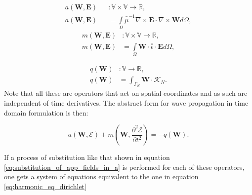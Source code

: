 \begin{equation}
\begin{array}{rcl}
      a(\mathbf{W},\mathbf{E})&&:\mathbb{V}\times \mathbb{V}\rightarrow \mathbb{R},\\
      a(\mathbf{W},\mathbf{E})&&= \int\limits_{\Omega}  \bar{\bar{\mu}}^{-1}\nabla\times \mathbf{E}\cdot \nabla\times\mathbf{W} d\Omega,
\label{eq:a_td_def}
\end{array}
\end{equation}
\begin{equation}
\begin{array}{rcl}
      m(\mathbf{W},\mathbf{E})&:\mathbb{V}\times \mathbb{V}\rightarrow \mathbb{R},\\
      m(\mathbf{W},\mathbf{E})&= \int\limits_{\Omega} \mathbf{W}\cdot \bar{\bar{\epsilon}}\cdot \mathbf{E} d\Omega,
\label{eq:m_td_def}
\end{array}
\end{equation}

\begin{equation}
\begin{array}{rcl}
      q(\mathbf{W})&:\mathbb{V}\rightarrow \mathbb{R},\\
      q(\mathbf{W})&=\int_{\Gamma_N} \mathbf{W} \cdot\mathcal{K}_N.
\label{eq:m_td_def}
\end{array}
\end{equation}
%
Note that all these are operators that act on spatial coordinates and as such are independent of time derivatives. The abstract form for wave propagation in time domain formulation is then:

\begin{equation}
a\left(\mathbf{W},\mathcal{E}\right)+m\left(\mathbf{W},\frac{\partial^2 \mathcal{E}}{\partial t^2}\right)
=-q\left(\mathbf{W}\right).
\end{equation}

If a process of substitution like that shown in equation \ref{eq:substitution_of_app_fields_in_a} is performed for each of these operators, one gets a system of equations equivalent to the one in equation \ref{eq:harmonic_eq_dirichlet}

